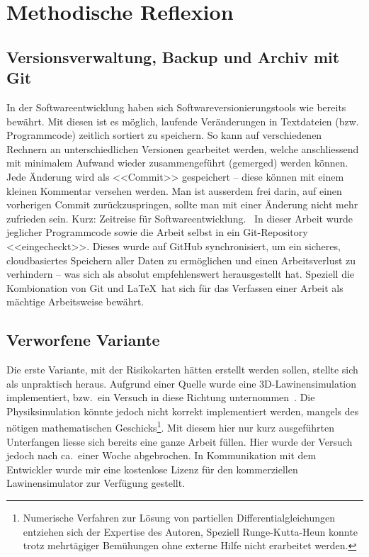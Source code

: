 \clearpage
{}
\section{Methodische Reflexion}
\subsection{Versionsverwaltung, Backup und Archiv mit Git}

In der Softwareentwicklung haben sich Softwareversionierungstools wie  bereits bewährt. Mit diesen ist es möglich, laufende Veränderungen in Textdateien (bzw. Programmcode) zeitlich sortiert zu speichern. So kann auf verschiedenen Rechnern an unterschiedlichen Versionen gearbeitet werden, welche anschliessend mit minimalem Aufwand wieder zusammengeführt (gemerged) werden können. Jede Änderung wird als <<Commit>> gespeichert -- diese können mit einem kleinen Kommentar versehen werden. Man ist ausserdem frei darin, auf einen vorherigen Commit zurückzuspringen, sollte man mit einer Änderung nicht mehr zufrieden sein. Kurz: Zeitreise für Softwareentwicklung.~\cite{chacon2014pro}
In dieser Arbeit wurde jeglicher Programmcode sowie die Arbeit selbst in ein Git-Repository <<eingecheckt>>. Dieses wurde auf GitHub synchronisiert, um ein sicheres, cloudbasiertes Speichern aller Daten zu ermöglichen und einen Arbeitsverlust zu verhindern -- was sich als absolut empfehlenswert herausgestellt hat. Speziell die Kombionation von Git und \LaTeX\ hat sich für das Verfassen einer Arbeit als mächtige Arbeitsweise bewährt.

\subsection{Verworfene Variante}

Die erste Variante, mit der Risikokarten hätten erstellt werden sollen, stellte sich als unpraktisch heraus. Aufgrund einer Quelle wurde eine 3D-Lawinensimulation implementiert, bzw.\ ein Versuch in diese Richtung unternommen\ \cite{athmaps}. Die Physiksimulation könnte jedoch nicht korrekt implementiert werden, mangels des nötigen mathematischen Geschicks\footnote{Numerische Verfahren zur Lösung von partiellen Differentialgleichungen entziehen sich der Expertise des Autoren, Speziell Runge-Kutta-Heun konnte trotz mehrtägiger Bemühungen ohne externe Hilfe nicht erarbeitet werden.}. Mit diesem hier nur kurz ausgeführten Unterfangen liesse sich bereits eine ganze Arbeit füllen. Hier wurde der Versuch jedoch nach ca.\ einer Woche abgebrochen. In Kommunikation mit dem Entwickler wurde mir eine kostenlose Lizenz für den kommerziellen Lawinensimulator  zur Verfügung gestellt.

